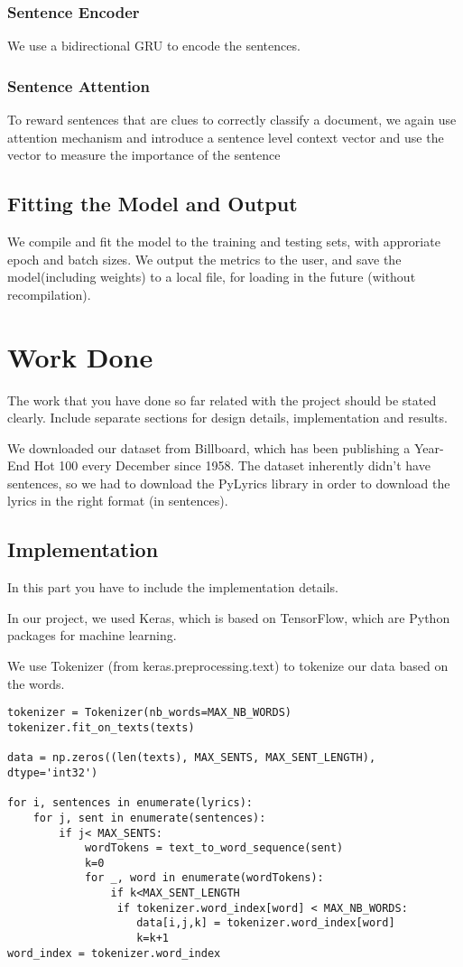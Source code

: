 \documentclass[a4paper,11pt,twocolumn]{article}
\begin{document}
\subsubsection{Sentence Encoder}
 We use a bidirectional GRU to encode the sentences.
 
\subsubsection{Sentence Attention}
To reward sentences that are
clues to correctly classify a document, we again use
attention mechanism and introduce a sentence level
context vector and use the vector to measure the
importance of the sentence

\subsection{Fitting the Model and Output}
We compile and fit the model to the training and testing sets, with approriate epoch and batch sizes. We output the metrics to the user, and save the model(including weights) to a local file, for loading in the future (without recompilation).
\section{Work Done}
The work that you have done so far related with the project should be stated  clearly. Include separate sections for design details, implementation and results.

We downloaded our dataset from Billboard, which has been publishing a Year-End Hot 100 every December since 1958. The dataset inherently didn't have sentences, so we had to download the PyLyrics library in order to download the lyrics in the right format (in sentences).
\subsection{Implementation}
In this part you have to include the implementation details.

In our project, we used Keras, which is based on TensorFlow, which are Python packages for machine learning.


We use Tokenizer (from keras.preprocessing.text) to tokenize our data based on the words.
\begin{lstlisting}
tokenizer = Tokenizer(nb_words=MAX_NB_WORDS)
tokenizer.fit_on_texts(texts)

data = np.zeros((len(texts), MAX_SENTS, MAX_SENT_LENGTH), dtype='int32')

for i, sentences in enumerate(lyrics):
	for j, sent in enumerate(sentences):
		if j< MAX_SENTS:
			wordTokens = text_to_word_sequence(sent)
			k=0
			for _, word in enumerate(wordTokens):
				if k<MAX_SENT_LENGTH
				 if tokenizer.word_index[word] < MAX_NB_WORDS:
					data[i,j,k] = tokenizer.word_index[word]
					k=k+1
word_index = tokenizer.word_index
\end{lstlisting}
\end{document}
